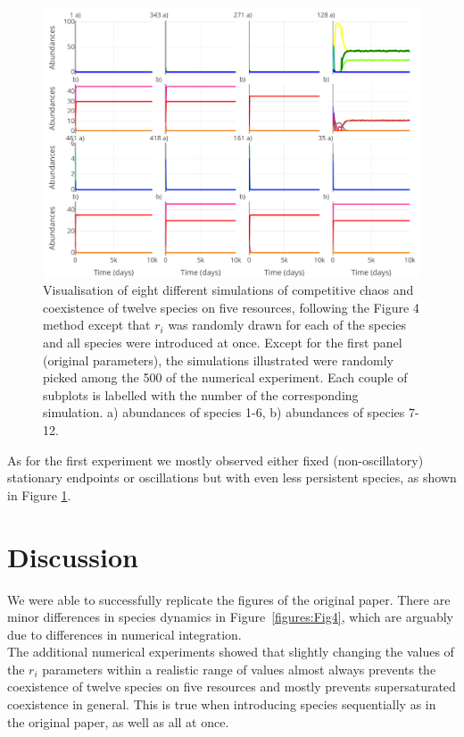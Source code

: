 \begin{figure}[H]
\begin{center} 
 \includegraphics[width=1\textwidth]{../Code/Figures/Figure_exp2.pdf}
  \caption{Visualisation of eight different simulations of competitive chaos and coexistence of twelve species on five resources, following the Figure 4 method except that $r_i$ was randomly drawn for each of the species and all species were introduced at once. Except for the first panel (original parameters), the simulations illustrated were randomly picked among the 500 of the numerical experiment. Each couple of subplots is labelled with the number of the corresponding simulation. a) abundances of species 1-6, b) abundances of species 7-12.}
  \label{figures:Figexp2}
\end{center}
\end{figure}

As for the first experiment we mostly observed either fixed (non-oscillatory) stationary endpoints or oscillations but with even less persistent species, as shown in Figure \ref{figures:Figexp2}.

\section{Discussion}

We were able to successfully replicate the figures of the original paper. There are minor differences in species dynamics in Figure~\ref{figures:Fig4}, which are arguably due to differences in numerical integration.\\

The additional numerical experiments showed that slightly changing the values of the $r_i$ parameters within a realistic range of values \cite{2015:Edwards} almost always prevents the coexistence of twelve species on five resources and mostly prevents supersaturated coexistence in general. This is true when introducing species sequentially as in the original paper, as well as all at once.\\

